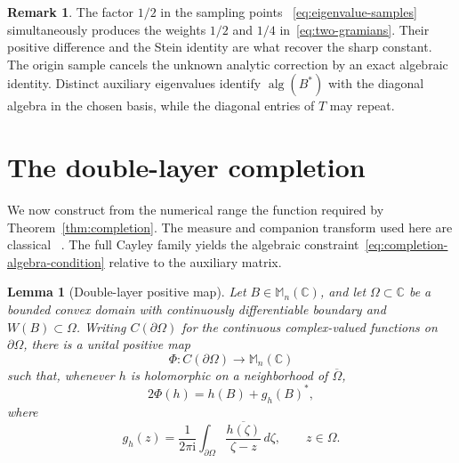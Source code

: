 \documentclass[preprints,article,submit,oneauthor]{Definitions/mdpi}
\newcounter{manuscriptresult}[section]
\theoremstyle{mdpi}
\newtheorem{lemma}[manuscriptresult]{Lemma}
\theoremstyle{definition}
\newtheorem{remark}[manuscriptresult]{Remark}
\newcommand{\C}{\mathbb C}
\newcommand{\Mn}{\mathbb M_n(\C)}
\newcommand{\alg}{\operatorname{alg}}
\newcommand{\iu}{\mathrm{i}}
\begin{document}
\begin{remark}
\label{rem:completion-novelty}
The factor $1/2$ in the sampling points~%
\eqref{eq:eigenvalue-samples} simultaneously produces the weights
$1/2$ and $1/4$ in~\eqref{eq:two-gramians}.  Their positive difference
and the Stein identity are what recover the sharp constant.  The
origin sample cancels the unknown analytic correction by an exact
algebraic identity.  Distinct auxiliary eigenvalues identify
$\alg(B^*)$ with the diagonal algebra in the chosen basis, while the
diagonal entries of $T$ may repeat.
\end{remark}

\section{The double-layer completion}
\label{sec:double-layer}

We now construct from the numerical range the function required by
Theorem~\ref{thm:completion}.  The measure and companion transform used
here are classical~%
\cite{DelyonDelyon1999,Crouzeix2007,CrouzeixPalencia2017}.  The full
Cayley family yields the algebraic
constraint~\eqref{eq:completion-algebra-condition} relative to the
auxiliary matrix.

\begin{lemma}[Double-layer positive map]
\label{lem:double-layer-map}
Let $B\in\Mn$, and let $\Omega\subset\C$ be a bounded convex domain
with continuously differentiable boundary and
$W(B)\subset\Omega$.  Writing $C(\partial\Omega)$ for the continuous
complex-valued functions on $\partial\Omega$, there is a unital positive map
\[
  \Phi\colon C(\partial\Omega)\longrightarrow\Mn
\]
such that, whenever $h$ is holomorphic on a neighborhood of
$\overline\Omega$,
\begin{equation}
  2\Phi(h)=h(B)+g_h(B)^*,
  \label{eq:double-layer-identity}
\end{equation}
where
\begin{equation}
  g_h(z)=\frac{1}{2\pi\iu}
  \int_{\partial\Omega}
  \frac{\overline{h(\zeta)}}{\zeta-z}\,d\zeta,
  \qquad z\in\Omega.
  \label{eq:companion-transform}
\end{equation}
\end{lemma}
\end{document}
